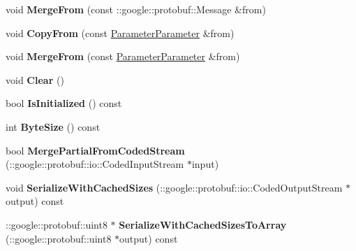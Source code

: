 \begin{DoxyCompactItemize}
\mbox{\label{classcaffe_1_1_parameter_parameter_a87d5be88ca3e2b7504ea52a19ca0a378}} 
void {\bfseries Merge\+From} (const \+::google\+::protobuf\+::\+Message \&from)
\item 
\mbox{\label{classcaffe_1_1_parameter_parameter_a7c0b0dca9f611516296d6fa8c06022a3}} 
void {\bfseries Copy\+From} (const \mbox{\hyperlink{classcaffe_1_1_parameter_parameter}{Parameter\+Parameter}} \&from)
\item 
\mbox{\label{classcaffe_1_1_parameter_parameter_acfbc6995768402253f9ac576bfd22616}} 
void {\bfseries Merge\+From} (const \mbox{\hyperlink{classcaffe_1_1_parameter_parameter}{Parameter\+Parameter}} \&from)
\item 
\mbox{\label{classcaffe_1_1_parameter_parameter_ac9db57f67ba93d7515a731d9c27f84cc}} 
void {\bfseries Clear} ()
\item 
\mbox{\label{classcaffe_1_1_parameter_parameter_a946255f3442bc9e33b5095049608b40a}} 
bool {\bfseries Is\+Initialized} () const
\item 
\mbox{\label{classcaffe_1_1_parameter_parameter_afb1400b9e82d3495473f1f1866094bff}} 
int {\bfseries Byte\+Size} () const
\item 
\mbox{\label{classcaffe_1_1_parameter_parameter_a4db8abc2f2bb1f62912119fb7cbedaca}} 
bool {\bfseries Merge\+Partial\+From\+Coded\+Stream} (\+::google\+::protobuf\+::io\+::\+Coded\+Input\+Stream $\ast$input)
\item 
\mbox{\label{classcaffe_1_1_parameter_parameter_aa130aaa50c910728c298543623359b55}} 
void {\bfseries Serialize\+With\+Cached\+Sizes} (\+::google\+::protobuf\+::io\+::\+Coded\+Output\+Stream $\ast$output) const
\item 
\mbox{\label{classcaffe_1_1_parameter_parameter_acceb335ac31a8fdea4e165f2e1b9cec8}} 
\+::google\+::protobuf\+::uint8 $\ast$ {\bfseries Serialize\+With\+Cached\+Sizes\+To\+Array} (\+::google\+::protobuf\+::uint8 $\ast$output) const

\end{DoxyCompactItemize}
